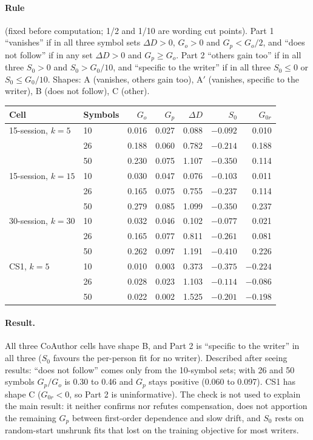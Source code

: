 \documentclass[10pt]{article}
\begin{document}
\paragraph{Rule} (fixed before computation; 1/2 and 1/10 are wording cut points). Part 1 ``vanishes'' if in all three symbol sets $\Delta D>0$, $G_o>0$ and $G_p<G_o/2$, and ``does not follow'' if in any set $\Delta D>0$ and $G_p\ge G_o$. Part 2 ``others gain too'' if in all three $S_0>0$ and $S_0>G_0/10$, and ``specific to the writer'' if in all three $S_0\le0$ or $S_0\le G_0/10$. Shapes: A (vanishes, others gain too), A$'$ (vanishes, specific to the writer), B (does not follow), C (other).

\begin{center}\small
\begin{tabular}{llrrrrr}
\toprule
Cell & Symbols & $G_o$ & $G_p$ & $\Delta D$ & $S_0$ & $G_{0r}$ \\
\midrule
15-session, $k=5$ & 10 & 0.016 & 0.027 & 0.088 & $-0.092$ & 0.010 \\
 & 26 & 0.188 & 0.060 & 0.782 & $-0.214$ & 0.188 \\
 & 50 & 0.230 & 0.075 & 1.107 & $-0.350$ & 0.114 \\
15-session, $k=15$ & 10 & 0.030 & 0.047 & 0.076 & $-0.103$ & 0.011 \\
 & 26 & 0.165 & 0.075 & 0.755 & $-0.237$ & 0.114 \\
 & 50 & 0.279 & 0.085 & 1.099 & $-0.350$ & 0.237 \\
30-session, $k=30$ & 10 & 0.032 & 0.046 & 0.102 & $-0.077$ & 0.021 \\
 & 26 & 0.165 & 0.077 & 0.811 & $-0.261$ & 0.081 \\
 & 50 & 0.262 & 0.097 & 1.191 & $-0.410$ & 0.226 \\
CS1, $k=5$ & 10 & 0.010 & 0.003 & 0.373 & $-0.375$ & $-0.224$ \\
 & 26 & 0.028 & 0.023 & 1.103 & $-0.114$ & $-0.086$ \\
 & 50 & 0.022 & 0.002 & 1.525 & $-0.201$ & $-0.198$ \\
\bottomrule
\end{tabular}
\end{center}

\paragraph{Result.} All three CoAuthor cells have shape B, and Part 2 is ``specific to the writer'' in all three ($S_0$ favours the per-person fit for no writer). Described after seeing results: ``does not follow'' comes only from the 10-symbol sets; with 26 and 50 symbols $G_p/G_o$ is 0.30 to 0.46 and $G_p$ stays positive (0.060 to 0.097). CS1 has shape C ($G_{0r}<0$, so Part 2 is uninformative). The check is not used to explain the main result: it neither confirms nor refutes compensation, does not apportion the remaining $G_p$ between first-order dependence and slow drift, and $S_0$ rests on random-start unshrunk fits that lost on the training objective for most writers.
\end{document}
